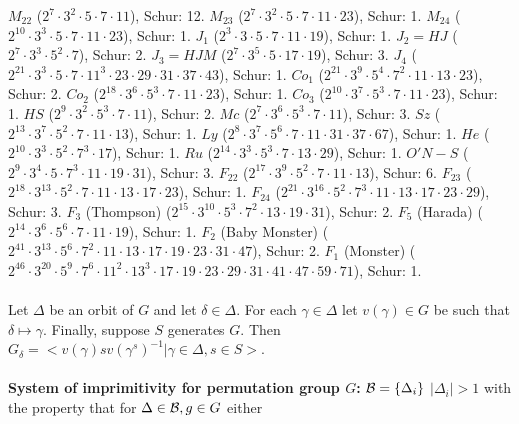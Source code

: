 $M_{22}$ ($2^{7} \cdot 3^2 \cdot 5 \cdot 7 \cdot 11$), Schur: 12.
$M_{23}$ ($2^{7} \cdot 3^2 \cdot 5 \cdot 7 \cdot 11 \cdot 23$), Schur: 1.
$M_{24}$ ($2^{10} \cdot 3^3 \cdot 5 \cdot 7 \cdot 11 \cdot 23$), Schur: 1.
$J_1$ ($2^{3} \cdot 3 \cdot 5 \cdot 7 \cdot 11 \cdot 19$), Schur: 1.
$J_2 = HJ$ ($2^{7} \cdot 3^3 \cdot 5^2 \cdot 7$), Schur: 2.
$J_3 = HJM$ ($2^{7} \cdot 3^5 \cdot 5 \cdot 17 \cdot 19$), Schur: 3.
$J_4$ ($2^{21} \cdot 3^3 \cdot 5 \cdot 7 \cdot 11^3 \cdot 23 \cdot 29 \cdot 31 \cdot 37 \cdot 43$), Schur: 1.
$Co_1$ ($2^{21} \cdot 3^9 \cdot 5^4 \cdot 7^2 \cdot 11 \cdot 13 \cdot 23$), Schur: 2.
$Co_2$ ($2^{18} \cdot 3^6 \cdot 5^3 \cdot 7 \cdot 11 \cdot 23$), Schur: 1.
$Co_3$ ($2^{10} \cdot 3^7 \cdot 5^3 \cdot 7 \cdot 11 \cdot 23$), Schur: 1.
$HS$ ($2^{9} \cdot 3^2 \cdot 5^3 \cdot 7 \cdot 11$), Schur: 2.
$Mc$ ($2^{7} \cdot 3^6 \cdot 5^3 \cdot 7 \cdot 11$), Schur: 3.
$Sz$ ($2^{13} \cdot 3^7 \cdot 5^2 \cdot 7 \cdot 11 \cdot 13$), Schur: 1.
$Ly$ ($2^{8} \cdot 3^7 \cdot 5^6 \cdot 7 \cdot 11 \cdot 31 \cdot 37 \cdot 67$), Schur: 1.
$He$ ($2^{10} \cdot 3^3 \cdot 5^2 \cdot 7^3 \cdot 17$), Schur: 1.
$Ru$ ($2^{14} \cdot 3^3 \cdot 5^3 \cdot 7 \cdot 13 \cdot 29$), Schur: 1.
$O'N-S$ ($2^9 \cdot 3^4 \cdot 5 \cdot 7^3 \cdot 11 \cdot 19 \cdot 31$), Schur: 3.
$F_{22}$ ($2^{17} \cdot 3^9 \cdot 5^2 \cdot 7 \cdot 11 \cdot 13$), Schur: 6.
$F_{23}$ ($2^{18} \cdot 3^{13} \cdot 5^2 \cdot 7 \cdot 11 \cdot 13 \cdot 17 \cdot 23$), Schur: 1.
$F_{24}$ ($2^{21} \cdot 3^{16} \cdot 5^2 \cdot 7^3 \cdot 11 \cdot 13 \cdot 17 \cdot 23 \cdot 29$), Schur: 3.
$F_3$ (Thompson) ($2^{15} \cdot 3^{10} \cdot 5^3 \cdot 7^2 \cdot 13 \cdot 19 \cdot 31$), Schur: 2.
$F_5$ (Harada) ($2^{14} \cdot 3^{6} \cdot 5^6 \cdot 7 \cdot 11 \cdot 19$), Schur: 1.
$F_2$ (Baby Monster) ($2^{41} \cdot 3^{13} \cdot 5^6 \cdot 7^2 \cdot 11 \cdot 13 
\cdot 17 \cdot 19 \cdot 23 \cdot 31 \cdot 47$), Schur: 2.
$F_1$ (Monster) ($2^{46} \cdot 3^{20} \cdot 5^9 \cdot 7^6 
\cdot 11^2 \cdot 13^3 \cdot 17 \cdot 19 \cdot 23 \cdot 29 \cdot 31 \cdot 41 \cdot 47 \cdot 
59 \cdot 71$), Schur: 1.\\
\\
Let $\Delta$ be an orbit of $G$ and let $\delta \in \Delta$.  For each $\gamma \in \Delta$
let $v(\gamma ) \in G$ be such that $\delta \mapsto \gamma$.  Finally, suppose $S$
generates $G$.  Then $G_{\delta}=<v(\gamma)sv(\gamma^{s})^{-1} | \gamma \in \Delta,
s \in S>$.\\
\\
{\bf System of imprimitivity for permutation 
group $G$:} ${\cal B}=\{ \Delta_i\}$ $|\Delta_i|>1$ with
the property that for $\Delta \in {\cal B}, g \in G$ either 
